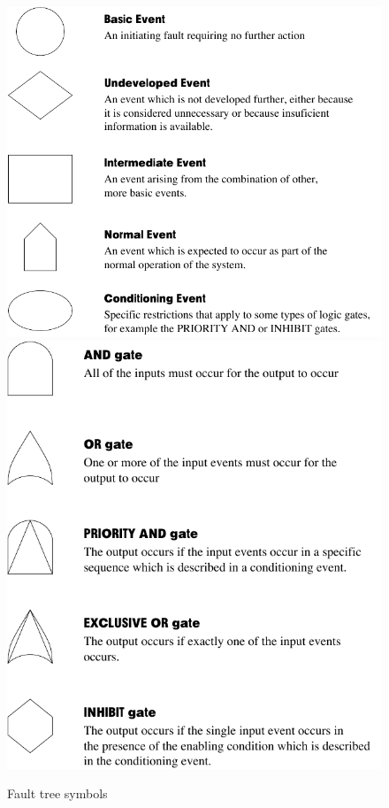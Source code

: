 \begin{figure}[!h]
  \centering

\vspace{10mm}

  \includegraphics[scale=0.79]{./figs/fault-tree-symbols}  \includegraphics[scale=0.6]{./figs/fault-tree-gates}
  \caption{Fault tree symbols}
  \label{fig:safety:fault-tree-symbols}
\end{figure}



